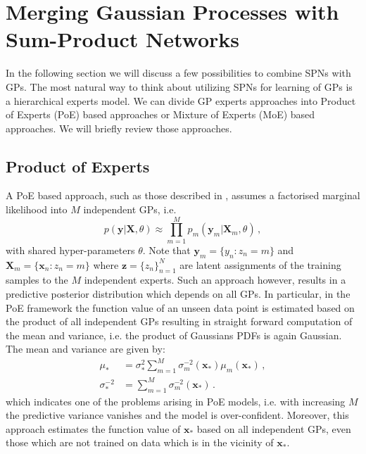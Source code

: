 \documentclass[10pt,letterpaper]{article}
\newcommand{\X}{\mathbf{X}}
\newcommand{\x}{\mathbf{x}}
\newcommand{\y}{\mathbf{y}}
\newcommand{\xn}{\mathbf{x}_{n}}
\newcommand{\new}{_{*}}
\theoremstyle{mystyle}
\begin{document}
\section{Merging Gaussian Processes with Sum-Product Networks}
In the following section we will discuss a few possibilities to combine SPNs with GPs.
The most natural way to think about utilizing SPNs for learning of GPs is a hierarchical experts model.
We can divide GP experts approaches into Product of Experts (PoE) based approaches or Mixture of Experts (MoE) based approaches. We will briefly review those approaches.
\subsection{Product of Experts}
A PoE based approach, such as those described in \cite{Deisenroth2015}, assumes a factorised marginal likelihood into $M$ independent GPs, i.e.
\[
  p(\y | \X, \theta) \approx \prod_{m=1}^M p_m(\y_m | \X_m, \theta) \, ,
\]
with shared hyper-parameters $\theta$. Note that $\y_m = \{y_n : z_n = m\}$ and $\X_m = \{\xn : z_n = m\}$ where $\bm z = \{z_n\}_{n=1}^N$ are latent assignments of the training samples to the $M$ independent experts.
Such an approach however, results in a predictive posterior distribution which depends on all GPs.
In particular, in the PoE framework the function value of an unseen data point is estimated based on the product of all independent GPs resulting in straight forward computation of the mean and variance, i.e. the product of  Gaussians PDFs is again Gaussian.
The mean and variance are given by:
\begin{align}
  \mu\new &= \sigma\new^2 \sum_{m=1}^M \sigma_m^{-2}(\x\new) \mu_m(\x\new) \, , \\
  \sigma\new^{-2} &= \sum_{m=1}^M \sigma_m^{-2}(\x\new) \, .
\end{align}
which indicates one of the problems arising in PoE models, i.e. with increasing $M$ the predictive variance vanishes and the model is over-confident. 
Moreover, this approach estimates the function value of $\x\new$ based on all independent GPs, even those which are not trained on data which is in the vicinity of $\x\new$.
\end{document}
